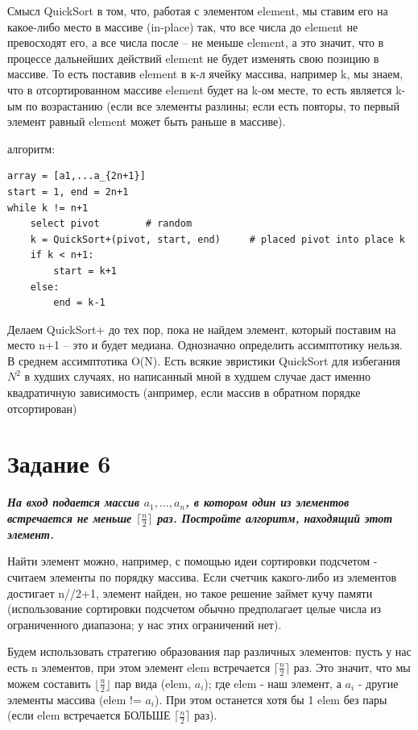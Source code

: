 \documentclass{article}
\begin{document}
Смысл QuickSort в том, что, работая с элементом element, мы ставим его на какое-либо место в массиве (in-place) так, что все числа до element не превосходят его, а все числа после -- не меньше element, а это значит, что в процессе дальнейших действий element не будет изменять свою позицию в массиве. То есть поставив element в к-л ячейку массива, например k, мы знаем, что в отсортированном массиве element будет на k-ом месте, то есть является k-ым по возрастанию (если все элементы разлины; если есть повторы, то первый элемент равный element может быть раньше в массиве). 

алгоритм:
\begin{verbatim}
array = [a1,...a_{2n+1}]
start = 1, end = 2n+1
while k != n+1
    select pivot        # random
    k = QuickSort+(pivot, start, end)     # placed pivot into place k
    if k < n+1:
        start = k+1
    else:
        end = k-1
\end{verbatim}

Делаем QuickSort+ до тех пор, пока не найдем элемент, который поставим на место n+1 -- это и будет медиана. Однозначно определить ассимптотику нельзя. В среднем ассимптотика O(N). Есть всякие эвристики QuickSort для избегания $N^2$ в худших случаях, но написанный мной в худшем случае даст именно квадратичную зависимость (анпример, если массив в обратном порядке отсортирован)

\section*{\textbf{Задание 6}}  \textbf{\textit{На вход подается массив $a_1, \dots, a_n$, в котором один из элементов встречается не меньше $\lceil \frac{n}{2} \rceil$ раз. Постройте алгоритм, находящий этот элемент.}}

Найти элемент можно, например, с помощью идеи сортировки подсчетом - считаем элементы по порядку массива. Если счетчик какого-либо из элементов достигает n//2+1, элемент найден, но такое решение займет кучу памяти (использование сортировки подсчетом обычно предполагает целые числа из ограниченного диапазона; у нас этих ограничений нет).

Будем использовать стратегию образования пар различных элементов: пусть у нас есть n элементов, при этом элемент elem встречается $\lceil \frac{n}{2} \rceil$ раз. Это значит, что мы можем составить $\lfloor \frac{n}{2} \rfloor$ пар вида (elem, $a_i$); где elem - наш элемент, а $a_i$ - другие элементы массива (elem != $a_i$). При этом останется хотя бы 1 elem без пары (если elem встречается БОЛЬШЕ $\lceil \frac{n}{2} \rceil$ раз). 
\end{document}
